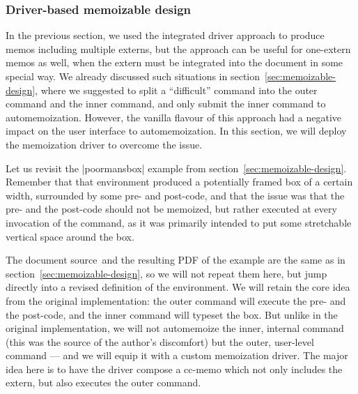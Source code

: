 \documentclass[a4paper,11pt]{article}
\begin{document}


\subsubsection{Driver-based memoizable design}
\label{sec:memoization-complex-single-driver}

In the previous section, we used the integrated driver approach to produce
memos including multiple externs, but the approach can be useful for one-extern
memos as well, when the extern must be integrated into the document in some
special way.  We already discussed such situations in
section~\ref{sec:memoizable-design}, where we suggested to split a
``difficult'' command into the outer command and the inner command, and only
submit the inner command to automemoization.  However, the vanilla flavour of
this approach had a negative impact on the user interface to automemoization.
In this section, we will deploy the memoization driver to overcome the issue.


Let us revisit the |poormansbox| example from
section~\ref{sec:memoizable-design}.  Remember that that environment produced
a potentially framed box of a certain width, surrounded by some pre- and
post-code, and that the issue was that the pre- and the post-code should not be
memoized, but rather executed at every invocation of the command, as it was
primarily intended to put some stretchable vertical space around the box.

The document source\attachexample\ and the resulting PDF of the example are the
same as in section~\ref{sec:memoizable-design}, so we will not repeat them
here, but jump directly into a revised definition of the environment.  We will
retain the core idea from the original implementation: the outer command will
execute the pre- and the post-code, and the inner command will typeset the box.
But unlike in the original implementation, we will not automemoize the inner,
internal command (this was the source of the author's discomfort) but the outer,
user-level command --- and we will equip it with a custom memoization driver.
The major idea here is to have the driver compose a cc-memo which not only
includes the extern, but also executes the outer command.

\end{document}
